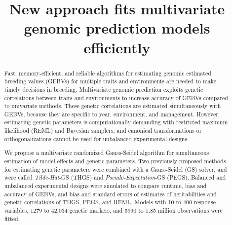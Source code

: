 \documentclass{bmcart}
\begin{document}
\begin{frontmatter}

\begin{fmbox}


\title{ New approach fits multivariate genomic prediction models efficiently }

\author[
   addressref={aff1,aff2},
   corref={aff1,aff2},
   noteref={n1},
   email={alencar.xavier@corteva.com}
]{ }
\author[
   addressref={aff1},
   email={david.habier@corteva.com}
]{ }


\address[id=aff1]{
,
  ,
  ,
  ,
}

\address[id=aff2]{
  ,
  ,
  ,
  ,
}


\begin{artnotes}
\end{artnotes}
\end{fmbox}%

\begin{abstractbox}

\begin{abstract} %

 Fast, memory-efficient, and reliable algorithms for estimating genomic estimated breeding values (GEBVs) for multiple traits and environments are needed to make timely decisions in breeding. Multivariate genomic prediction exploits genetic correlations between traits and environments to increase accuracy of GEBVs compared to univariate methods. These genetic correlations are estimated simultaneously with GEBVs, because they are specific to year, environment, and management. However, estimating genetic parameters is computationally demanding with restricted maximum likelihood (REML) and Bayesian samplers, and canonical transformations or orthogonalizations cannot be used for unbalanced experimental designs. 

 We propose a multivariate randomized Gauss-Seidel algorithm for simultaneous estimation of model effects and genetic parameters. Two previously proposed methods for estimating genetic parameters were combined with a Gauss-Seidel (GS) solver, and were called \textsl{Tilde-Hat}-GS (THGS) and \textsl{Pseudo-Expectation}-GS (PEGS). Balanced and unbalanced experimental designs were simulated to compare runtime, bias and accuracy of GEBVs, and bias and standard errors of estimates of heritabilities and genetic correlations of THGS, PEGS, and REML. Models with 10 to 400 response variables, 1279 to 42,034 genetic markers, and 5990 to 1.85 million observations were fitted.


\end{abstract}
\end{abstractbox}
\end{frontmatter}
\end{document}
